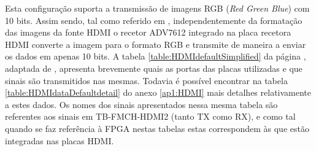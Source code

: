 Esta configuração suporta a transmissão de imagens RGB (\textit{Red Green Blue}) com 10 bits. Assim sendo, tal como referido em \cite{R009}, independentemente da formatação das imagens da fonte HDMI o recetor ADV7612 integrado na placa recetora HDMI converte a imagem para o formato RGB e transmite de maneira a enviar os dados em apenas 10 bits. A tabela \ref{table:HDMIdefaultSimplified} da página \pageref{table:HDMIdefaultSimplified}, adaptada de \cite{R009}, apresenta brevemente quais as portas das placas utilizadas e que sinais são transmitidos nas mesmas. Todavia é possível encontrar na tabela \ref{table:HDMIdataDefaultdetail} do anexo \ref{ap1:HDMI} mais detalhes relativamente a estes dados. Os nomes dos sinais apresentados nessa mesma tabela são referentes aos sinais em TB-FMCH-HDMI2 (tanto TX como RX), e como tal quando se faz referência à FPGA nestas tabelas estas correspondem às que estão integradas nas placas HDMI. 


